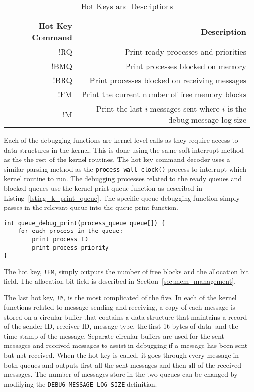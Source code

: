\documentclass[oneside]{report}
\begin{document}
\begin{table}[h]
    \caption{Hot Keys and Descriptions}
    \label{hot_keys_table}
    \begin{tabular}{| r | r |}
        \hline
        Hot Key Command & Description \\
        \hline
        !RQ & Print ready processes and priorities \\ 
        !BMQ & Print processes blocked on memory \\ 
        !BRQ & Print processes blocked on receiving messages \\ 
        !FM & Print the current number of free memory blocks \\ 
        !M & Print the last $i$ messages sent where $i$ is the debug message
        log size \\
        \hline
    \end{tabular}
\end{table}

Each of the debugging functions are kernel level calls as they require access
to data structures in the kernel. This is done using the same soft interrupt
method as the the rest of the kernel routines. The hot key command decoder
uses a similar parsing method as the \texttt{process\_wall\_clock()} process to
interrupt which kernel routine to run. The debugging processes related to the
ready queues and blocked queues use the kernel print queue function as
described in Listing~\ref{lsting_k_print_queue}. The specific queue debugging 
function simply passes in the relevant queue into the queue print function.

\begin{lstlisting}
int queue_debug_print(process_queue queue[]) {
    for each process in the queue:
        print process ID
        print process priority
}
\end{lstlisting}

The hot key, \texttt{!FM}, simply outputs the number of free blocks and the
allocation bit field. The allocation bit field is described in
Section~\ref{sec:mem_management}.

The last hot key, \texttt{!M}, is the most complicated of the five. In each of
the kernel functions related to message sending and receiving, a copy of each
message is stored on a circular buffer that contains a data structure that
maintains a record of the sender ID, receiver ID, message type, the first 16
bytes of data, and the time stamp of the message. Separate circular buffers are
used for the sent messages and received messages to assist in debugging if a
message has been sent but not received.  When the hot key is called, it goes
through every message in both queues and outputs first all the sent messages
and then all of the received messages. The number of messages store in the two
queues can be changed by modifying the \texttt{DEBUG\_MESSAGE\_LOG\_SIZE}
definition. 
\end{document}
